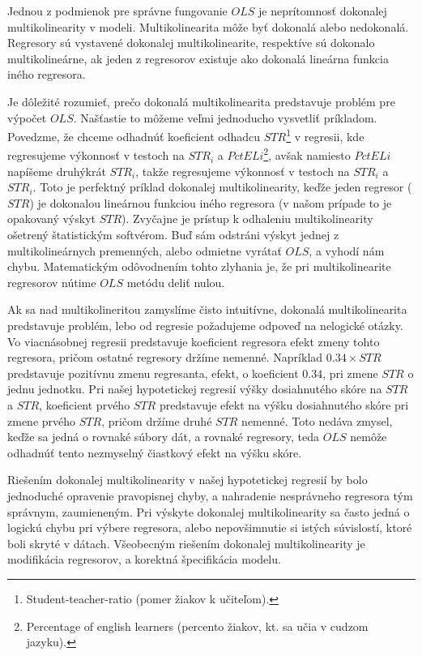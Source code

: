 \documentclass[]{tukediphc}
\begin{document}
Jednou z podmienok pre správne fungovanie $OLS$ je neprítomnosť dokonalej multikolinearity v modeli. Multikolinearita môže byť dokonalá alebo nedokonalá. Regresory sú vystavené dokonalej multikolinearite, respektíve sú dokonalo multikolineárne, ak jeden z regresorov existuje ako dokonalá lineárna funkcia iného regresora. 

Je dôležité rozumieť, prečo dokonalá multikolinearita predstavuje problém pre výpočet $OLS$. Našťastie to môžeme veľmi jednoducho vysvetliť príkladom. Povedzme, že chceme odhadnúť koeficient odhadcu $STR$\footnote{Student-teacher-ratio (pomer žiakov k učiteľom).} v regresii, kde regresujeme výkonnosť v testoch na $STR_i$ a $PctELi$\footnote{Percentage of english learners (percento žiakov, kt. sa učia v cudzom jazyku).}, avšak namiesto $PctELi$ napíšeme druhýkrát $STR_i$, takže regresujeme výkonnosť v testoch na $STR_i$ a $STR_i$. Toto je perfektný príklad dokonalej multikolinearity, keďže jeden regresor ($STR$) je dokonalou lineárnou funkciou iného regresora (v našom prípade to je opakovaný výskyt $STR$). Zvyčajne je prístup k odhaleniu multikolinearity ošetrený štatistickým softvérom. Buď sám odstráni výskyt jednej z multikolineárnych premenných, alebo odmietne vyrátať $OLS$, a vyhodí nám chybu. Matematickým odôvodnením tohto zlyhania je, že pri multikolinearite regresorov nútime $OLS$ metódu deliť nulou. 

Ak sa nad multikolineritou zamyslíme čisto intuitívne, dokonalá multikolinearita predstavuje problém, lebo od regresie požadujeme odpoveď na nelogické otázky. Vo viacnásobnej regresii predstavuje koeficient regresora efekt zmeny tohto regresora, pričom ostatné regresory držíme nemenné. Napríklad $0.34 \times STR$ predstavuje pozitívnu zmenu regresanta, efekt, o koeficient $0.34$, pri zmene $STR$ o jednu jednotku. Pri našej hypotetickej regresií výšky dosiahnutého skóre na $STR$ a $STR$, koeficient prvého $STR$ predstavuje efekt na výšku dosiahnutého skóre pri zmene prvého $STR$, pričom držíme druhé $STR$ nemenné. Toto nedáva zmysel, keďže sa jedná o rovnaké súbory dát, a rovnaké regresory, teda $OLS$ nemôže odhadnúť tento nezmyselný čiastkový efekt na výšku skóre. 

Riešením dokonalej multikolinearity v našej hypotetickej regresií by bolo jednoduché opravenie pravopisnej chyby, a nahradenie nesprávneho regresora tým správnym, zaumieneným. Pri výskyte dokonalej multikolinearity sa často jedná o logickú chybu pri výbere regresora, alebo nepovšimnutie si istých súvislostí, ktoré boli skryté v dátach. Všeobecným riešením dokonalej multikolinearity je modifikácia regresorov, a korektná špecifikácia modelu. 
\end{document}
